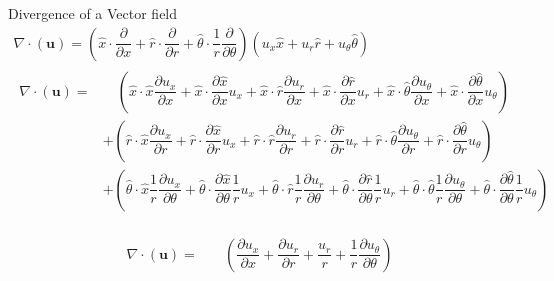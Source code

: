 \documentclass{kthreport}
\begin{document}
Divergence of a Vector field
\begin{eqnarray}
	\nabla\cdot(\bm{u}) = \left(\hat{x}\cdot\dfrac{\partial }{\partial x} + \hat{r}\cdot\dfrac{\partial }{\partial r} + \hat{\theta}\cdot\dfrac{1}{r}\dfrac{\partial }{\partial \theta}	\right) \left(u_{x}\hat{x} + u_{r}\hat{r} + u_{\theta}\hat{\theta} \right) \nonumber \\
	\begin{split}
	\nabla\cdot(\bm{u}) = & \quad \left(\hat{x}\cdot\hat{x}\dfrac{\partial u_{x}}{\partial x} + 
	\hat{x}\cdot\dfrac{\partial \hat{x}}{\partial x}u_{x} + \hat{x}\cdot\hat{r}\dfrac{\partial u_{r}}{\partial x} + \hat{x}\cdot\dfrac{\partial\hat{r}}{\partial x}u_{r} + 
	\hat{x}\cdot\hat{\theta}\dfrac{\partial u_{\theta}}{\partial x} +
	\hat{x}\cdot\dfrac{\partial \hat{\theta}}{\partial x}u_{\theta} \right) \\
	& + \left(\hat{r}\cdot\hat{x}\dfrac{\partial u_{x}}{\partial r} + 		\hat{r}\cdot\dfrac{\partial \hat{x}}{\partial r}u_{x} + \hat{r}\cdot\hat{r}\dfrac{\partial u_{r}}{\partial r} + \hat{r}\cdot\dfrac{\partial\hat{r}}{\partial r}u_{r} + 
	\hat{r}\cdot\hat{\theta}\dfrac{\partial u_{\theta}}{\partial r} +
	\hat{r}\cdot\dfrac{\partial \hat{\theta}}{\partial r}u_{\theta} \right) \\
	& + \left(\hat{\theta}\cdot\hat{x}\dfrac{1}{r}\dfrac{\partial u_{x}}{\partial \theta} +	
	\hat{\theta}\cdot\dfrac{\partial \hat{x}}{\partial \theta}\dfrac{1}{r}u_{x} +
	\hat{\theta}\cdot\hat{r}\dfrac{1}{r}\dfrac{\partial u_{r}}{\partial \theta} +
	\hat{\theta}\cdot\dfrac{\partial\hat{r}}{\partial \theta}\dfrac{1}{r}u_{r} + 
	\hat{\theta}\cdot\hat{\theta}\dfrac{1}{r}\dfrac{\partial u_{\theta}}{\partial \theta} +
	\hat{\theta}\cdot\dfrac{\partial \hat{\theta}}{\partial \theta}\dfrac{1}{r}u_{\theta} \right)	
	\end{split} \nonumber
\end{eqnarray}

\begin{eqnarray}
	\begin{split}
		\nabla\cdot(\bm{u}) = & \quad \left(\dfrac{\partial u_{x}}{\partial x} + \dfrac{\partial u_{r}}{\partial r} + \dfrac{u_{r}}{r} + 
		\dfrac{1}{r}\dfrac{\partial u_{\theta}}{\partial \theta}
		\right)	
	\end{split} \label{eqn:cylindrical_divergence}
\end{eqnarray}
\end{document}
